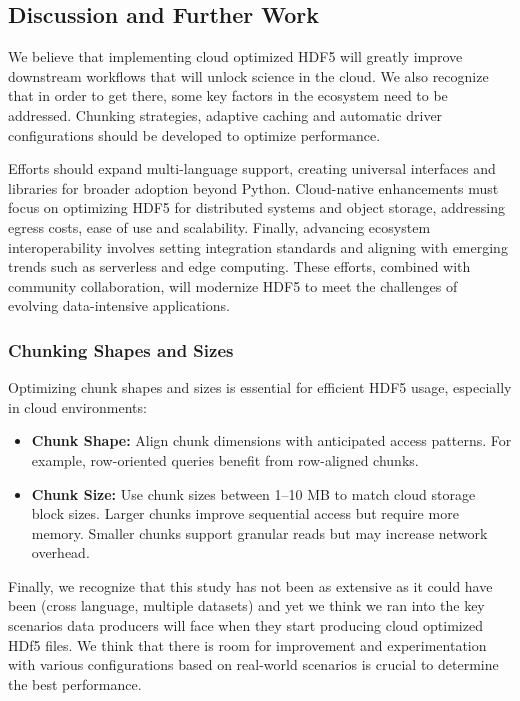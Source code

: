 \documentclass[
]{agujournal2019}
\providecommand{\tightlist}{%
  \setlength{\itemsep}{0pt}\setlength{\parskip}{0pt}}\usepackage{longtable,booktabs,array}
\begin{document}
\subsection{Discussion and Further
Work}\label{discussion-and-further-work}

We believe that implementing cloud optimized HDF5 will greatly improve
downstream workflows that will unlock science in the cloud. We also
recognize that in order to get there, some key factors in the ecosystem
need to be addressed. Chunking strategies, adaptive caching and
automatic driver configurations should be developed to optimize
performance.

Efforts should expand multi-language support, creating universal
interfaces and libraries for broader adoption beyond Python.
Cloud-native enhancements must focus on optimizing HDF5 for distributed
systems and object storage, addressing egress costs, ease of use and
scalability. Finally, advancing ecosystem interoperability involves
setting integration standards and aligning with emerging trends such as
serverless and edge computing. These efforts, combined with community
collaboration, will modernize HDF5 to meet the challenges of evolving
data-intensive applications.

\subsubsection{Chunking Shapes and
Sizes}\label{chunking-shapes-and-sizes}

Optimizing chunk shapes and sizes is essential for efficient HDF5 usage,
especially in cloud environments:

\begin{itemize}
\tightlist
\item
  \textbf{Chunk Shape:} Align chunk dimensions with anticipated access
  patterns. For example, row-oriented queries benefit from row-aligned
  chunks.
\item
  \textbf{Chunk Size:} Use chunk sizes between 1--10 MB to match cloud
  storage block sizes. Larger chunks improve sequential access but
  require more memory. Smaller chunks support granular reads but may
  increase network overhead.
\end{itemize}

Finally, we recognize that this study has not been as extensive as it
could have been (cross language, multiple datasets) and yet we think we
ran into the key scenarios data producers will face when they start
producing cloud optimized HDf5 files. We think that there is room for
improvement and experimentation with various configurations based on
real-world scenarios is crucial to determine the best performance.
\end{document}
